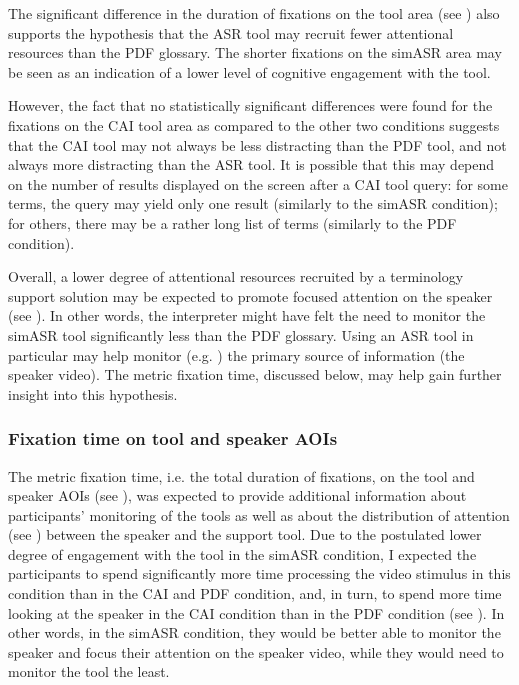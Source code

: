 The significant difference in the duration of fixations on the tool area (see ) also supports the hypothesis that the ASR tool may recruit fewer attentional resources than the PDF glossary. The shorter fixations on the simASR area may be seen as an indication of a lower level of cognitive engagement with the tool.

However, the fact that no statistically significant differences were found for the fixations on the CAI tool area as compared to the other two conditions suggests that the CAI tool may not always be less distracting than the PDF tool, and not always more distracting than the ASR tool. It is possible that this may depend on the number of results displayed on the screen after a CAI tool query: for some terms, the query may yield only one result (similarly to the simASR condition); for others, there may be a rather long list of terms (similarly to the PDF condition).

Overall, a lower degree of attentional resources recruited by a terminology support solution may be expected to promote focused attention on the speaker (see ). In other words, the interpreter might have felt the need to monitor the simASR tool significantly less than the PDF glossary. Using an ASR tool in particular may help monitor (e.g. \citealt{schaeffer2019monitoring}) the primary source of information (the speaker video). The metric fixation time, discussed below, may help gain further insight into this hypothesis.

\subsubsection{Fixation time on tool and speaker AOIs} \label{fixtimedisc}
The metric fixation time, i.e. the total duration of fixations, on the tool and speak\-er AOIs (see ), was expected to provide additional information about participants' monitoring of the tools as well as about the distribution of attention (see ) between the speaker and the support tool. Due to the postulated lower degree of engagement with the tool in the simASR condition, I expected the participants to spend significantly more time processing the video stimulus in this condition than in the CAI and PDF condition, and, in turn, to spend more time looking at the speaker in the CAI condition than in the PDF condition (see ). In other words, in the simASR condition, they would be better able to monitor the speaker and focus their attention on the speaker video, while they would need to monitor the tool the least.

